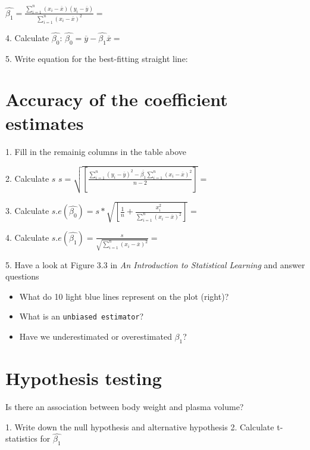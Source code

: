 \documentclass[12pt]{article}\usepackage[]{graphicx}\usepackage[]{color}
\begin{document}
$\hat{\beta_1}= \frac{\sum_{i=1}^{n}(x_i-\overline{x})(y_i-\overline{y})}{\sum_{i=1}^{n}(x_i-\overline{x})^2}=$ \newline
\vspace{0.5cm}

4. Calculate $\hat{\beta_0}$: \newline
\vspace{0.1cm} 
$\hat{\beta_0}=\overline{y}-\hat{\beta_1}\overline{x}=$ \newline

5. Write equation for the best-fitting straight line:



\section{Accuracy of the coefficient estimates}

1. Fill in the remainig columns in the table above
\vspace{1cm} 

2. Calculate $s$
$s=\sqrt{[\frac{\sum_{i=1}^{n}(y_i-\overline{y})^2-\overline{\beta_1}\sum_{i=1}^{n}(x_i-\overline{x})^2}{n-2}]}=$
\vspace{1cm} 

3. Calculate 
$s.e(\hat{\beta_0})=s*\sqrt{[\frac{1}{n}+\frac{x_i^2}{\sum_{i=1}^{n}(x_i-\overline{x})^2}]}=$
\vspace{1cm} 

4. Calculate
$s.e(\hat{\beta_1})=\frac{s}{\sqrt{\sum_{i=1}^{n}(x_i-\overline{x})^2}}=$
\vspace{0.2cm} 

5. Have a look at Figure 3.3 in \textit{An Introduction to Statistical Learning} and answer questions
\begin{itemize}
  \item What do 10 light blue lines represent on the plot (right)?
  \item What is an \texttt{unbiased estimator}?
  \item Have we underestimated or overestimated ${\beta_1}$?
\end{itemize}

\section{Hypothesis testing}
Is there an association between body weight and plasma volume? 

1. Write down the null hypothesis and alternative hypothesis
2. Calculate t-statistics for $\hat{\beta_1}$ \newline
\end{document}
